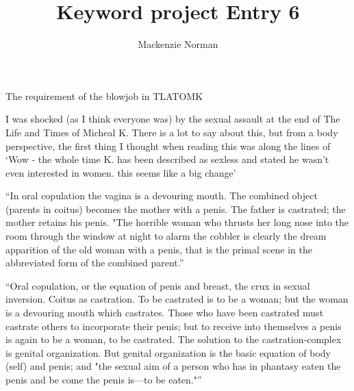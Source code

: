 \documentclass{article}
\title{Keyword project Entry 6}
\author{Mackenzie Norman}
\begin{document}
\maketitle 
The requirement of the blowjob in TLATOMK

I was shocked (as I think everyone was) by the sexual assault at the end of The Life and Times of Micheal K. There is a lot to say about this, but from a body perspective, the first thing I thought when reading this was along the lines of `Wow - the whole time K. has been described as sexless and stated he wasn't even interested in women. this seems like a big change' 

``In oral copulation the vagina is a devouring mouth.
 The combined object (parents in coitus) becomes the
 mother with a penis. The father is castrated; the mother
 retains his penis. "The horrible woman who thrusts her
 long nose into the room through the window at night
 to alarm the cobbler is clearly the dream apparition of
 the old woman with a penis, that is the primal scene in
 the abbreviated form of the combined parent.''

 ``Oral copulation, or the equation of penis and breast,
 the crux in sexual inversion. Coitus as castration. To be
 castrated is to be a woman; but the woman is a devouring
 mouth which castrates. Those who have been castrated
 must castrate others to incorporate their penis; but to receive into themselves a penis is again to be a woman, to
 be castrated. The solution to the castration-complex is
 genital organization. But genital organization is the basic
 equation of body (self) and penis; and "the sexual aim
 of a person who has in phantasy eaten the penis and be
come the penis is—to be eaten."''
\end{document}
